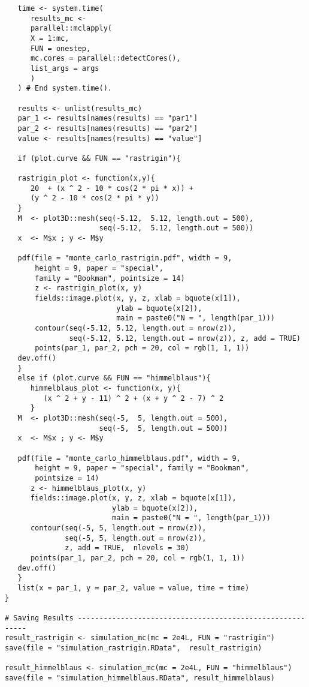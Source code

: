 \documentclass[10pt,letterpaper]{article}
\begin{document}
\begin{verbatim}
   time <- system.time(
      results_mc <-
      parallel::mclapply(
      X = 1:mc,
      FUN = onestep,
      mc.cores = parallel::detectCores(),
      list_args = args
      )
   ) # End system.time().

   results <- unlist(results_mc)
   par_1 <- results[names(results) == "par1"]
   par_2 <- results[names(results) == "par2"]
   value <- results[names(results) == "value"]

   if (plot.curve && FUN == "rastrigin"){

   rastrigin_plot <- function(x,y){
      20  + (x ^ 2 - 10 * cos(2 * pi * x)) +
      (y ^ 2 - 10 * cos(2 * pi * y))
   }
   M  <- plot3D::mesh(seq(-5.12,  5.12, length.out = 500),
                      seq(-5.12,  5.12, length.out = 500))
   x  <- M$x ; y <- M$y

   pdf(file = "monte_carlo_rastrigin.pdf", width = 9,
       height = 9, paper = "special",
       family = "Bookman", pointsize = 14)
       z <- rastrigin_plot(x, y)
       fields::image.plot(x, y, z, xlab = bquote(x[1]),
                          ylab = bquote(x[2]),
                          main = paste0("N = ", length(par_1)))
       contour(seq(-5.12, 5.12, length.out = nrow(z)),
               seq(-5.12, 5.12, length.out = nrow(z)), z, add = TRUE)
       points(par_1, par_2, pch = 20, col = rgb(1, 1, 1))
   dev.off()
   }
   else if (plot.curve && FUN == "himmelblaus"){
      himmelblaus_plot <- function(x, y){
         (x ^ 2 + y - 11) ^ 2 + (x + y ^ 2 - 7) ^ 2
      }
   M  <- plot3D::mesh(seq(-5,  5, length.out = 500),
                      seq(-5,  5, length.out = 500))
   x  <- M$x ; y <- M$y

   pdf(file = "monte_carlo_himmelblaus.pdf", width = 9,
       height = 9, paper = "special", family = "Bookman",
       pointsize = 14)
      z <- himmelblaus_plot(x, y)
      fields::image.plot(x, y, z, xlab = bquote(x[1]),
                         ylab = bquote(x[2]),
                         main = paste0("N = ", length(par_1)))
      contour(seq(-5, 5, length.out = nrow(z)),
              seq(-5, 5, length.out = nrow(z)),
              z, add = TRUE,  nlevels = 30)
      points(par_1, par_2, pch = 20, col = rgb(1, 1, 1))
   dev.off()
   }
   list(x = par_1, y = par_2, value = value, time = time)
}

# Saving Results ----------------------------------------------------------
result_rastrigin <- simulation_mc(mc = 2e4L, FUN = "rastrigin")
save(file = "simulation_rastrigin.RData",  result_rastrigin)

result_himmelblaus <- simulation_mc(mc = 2e4L, FUN = "himmelblaus")
save(file = "simulation_himmelblaus.RData", result_himmelblaus)
\end{verbatim}
\end{document}
